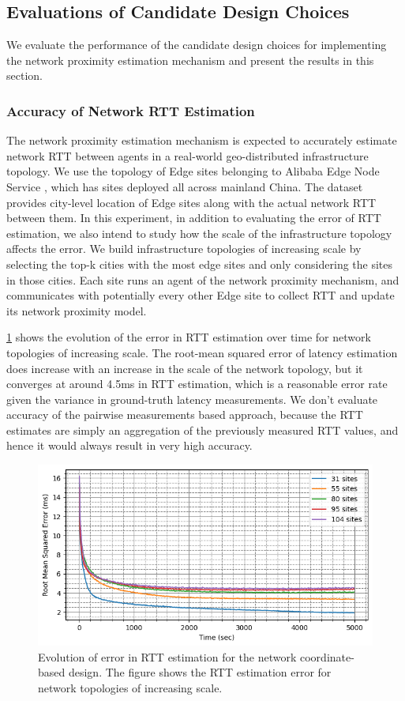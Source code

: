 \subsection{Evaluations of Candidate Design Choices} 
We evaluate the performance of the candidate design choices for implementing the network proximity estimation mechanism and present the results in this section.

\subsubsection{Accuracy of Network RTT Estimation}
\label{sec:nw_rtt_error}
The network proximity estimation mechanism is expected to accurately estimate network RTT between agents in a real-world geo-distributed infrastructure topology. We use the topology of Edge sites belonging to Alibaba Edge Node Service \cite{xu2021cloud}, which has sites deployed all across mainland China. The dataset provides city-level location of Edge sites along with the actual network RTT between them. In this experiment, in addition to evaluating the error of RTT estimation, we also intend to study how the scale of the infrastructure topology affects the error. We build infrastructure topologies of increasing scale by selecting the top-k cities with the most edge sites and only considering the sites in those cities. Each site runs an agent of the network proximity mechanism, and communicates with potentially every other Edge site to collect RTT and update its network proximity model.
\par \cref{fig:nw_coord_error} shows the evolution of the error in RTT estimation over time for network topologies of increasing scale. The root-mean squared error of latency estimation does increase with an increase in the scale of the network topology, but it converges at around 4.5ms in RTT estimation, which is a reasonable error rate given the variance in ground-truth latency measurements. We don't evaluate accuracy of the pairwise measurements based approach, because the RTT estimates are simply an aggregation of the previously measured RTT values, and hence it would always result in very high accuracy. \begin{figure}
\centering
\includegraphics[width=0.75\linewidth]{figures/design_space/nw_prox/error.png}
\caption{Evolution of error in RTT estimation for the network coordinate-based design. The figure shows the RTT estimation error for network topologies of increasing scale.}
\label{fig:nw_coord_error}
\end{figure}

